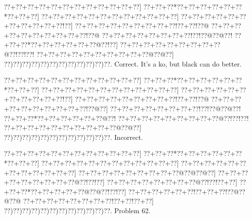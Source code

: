 \documentclass[a5paper]{article}
\begin{document}
\begin{center}
{\goo
\0??+\0??+\0??+\0??+\0??+\0??+\0??+\0??+\0??+\0??+\0??+\0??]
\0??+\0??+\0??*\0??+\0??+\0??+\0??+\0??+\0??*\0??+\0??+\0??]
\0??+\0??+\0??+\0??+\0??+\0??+\0??+\0??+\0??+\0??+\0??+\0??]
\0??+\0??+\0??+\0??+\0??+\0??+\0??+\0??+\0??+\0??+\0??!\0??]
\0??+\0??+\0??+\0??+\0??+\0??+\0??+\0??+\0??!\0??+\0??!\0??@
\0??+\0??+\0??+\0??+\0??+\0??+\0??+\0??+\0??+\0??!\0??@
\0??+\0??+\0??+\0??+\0??+\0??+\0??+\0??!\0??!\0??@\0??@\0??!
\0??+\0??+\0??*\0??+\0??+\0??+\0??+\0??+\0??@\0??!\0??]
\0??+\0??+\0??+\0??+\0??+\0??+\0??+\0??+\0??@\0??!\0??!\0??!
\0??+\0??+\0??+\0??+\0??+\0??+\0??+\0??+\0??+\0??@\0??@\0??]
\0??)\0??)\0??)\0??)\0??)\0??)\0??)\0??)\0??)\0??)\0??)\0??.
}
Correct. It's a ko, but black can do better.

\end{center}
\begin{center}
{\goo
\0??+\0??+\0??+\0??+\0??+\0??+\0??+\0??+\0??+\0??+\0??+\0??]
\0??+\0??+\0??*\0??+\0??+\0??+\0??+\0??+\0??*\0??+\0??+\0??]
\0??+\0??+\0??+\0??+\0??+\0??+\0??+\0??+\0??+\0??+\0??+\0??]
\0??+\0??+\0??+\0??+\0??+\0??+\0??+\0??+\0??+\0??+\0??!\0??]
\0??+\0??+\0??+\0??+\0??+\0??+\0??+\0??+\0??!\0??+\0??!\0??@
\0??+\0??+\0??+\0??+\0??+\0??+\0??+\0??+\0??+\0??!\0??@\0??]
\0??+\0??+\0??+\0??+\0??+\0??+\0??+\0??!\0??!\0??@\0??@\0??!
\0??+\0??+\0??*\0??+\0??+\0??+\0??+\0??+\0??@\0??!
\0??+\0??+\0??+\0??+\0??+\0??+\0??+\0??+\0??@\0??!\0??!\0??!
\0??+\0??+\0??+\0??+\0??+\0??+\0??+\0??+\0??+\0??@\0??@\0??]
\0??)\0??)\0??)\0??)\0??)\0??)\0??)\0??)\0??)\0??)\0??)\0??.
}
Incorrect. 

\end{center}
\newpage
\begin{center}
{\goo
\0??+\0??+\0??+\0??+\0??+\0??+\0??+\0??+\0??+\0??+\0??+\0??]
\0??+\0??+\0??*\0??+\0??+\0??+\0??+\0??+\0??*\0??+\0??+\0??]
\0??+\0??+\0??+\0??+\0??+\0??+\0??+\0??+\0??+\0??+\0??+\0??]
\0??+\0??+\0??+\0??+\0??+\0??+\0??+\0??+\0??+\0??+\0??+\0??]
\0??+\0??+\0??+\0??+\0??+\0??+\0??+\0??+\0??@\0??@\0??@\0??]
\0??+\0??+\0??+\0??+\0??+\0??+\0??+\0??+\0??@\0??!\0??!\0??]
\0??+\0??+\0??+\0??+\0??+\0??+\0??+\0??@\0??!\0??!\0??+\0??]
\0??+\0??+\0??*\0??+\0??+\0??+\0??+\0??@\0??@\0??!\0??!\0??]
\0??+\0??+\0??+\0??+\0??+\0??!\0??+\0??+\0??!\0??@\0??@\0??@
\0??+\0??+\0??+\0??+\0??+\0??+\0??+\0??!\0??+\0??!\0??+\0??]
\0??)\0??)\0??)\0??)\0??)\0??)\0??)\0??)\0??)\0??)\0??)\0??.
}
Problem 62.

\end{center}
\end{document}
